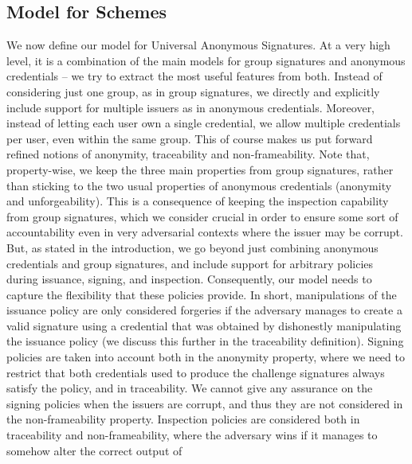 \subsection{Model for \UAS Schemes}
\label{ssec:model-uas}


We now define our model for Universal Anonymous Signatures. At a very high
level, it is a combination of the main models for group signatures and
anonymous credentials -- we try to extract the most useful features from both.
Instead of considering just one group, as in group signatures, we directly and
explicitly include support for multiple issuers as in anonymous credentials.
Moreover, instead of letting each user own a single credential, we allow
multiple credentials per user, even within the same group. This of course
makes us put forward refined notions of anonymity, traceability and
non-frameability. Note that, property-wise, we keep the three main properties
from group signatures, rather than sticking to the two usual properties of
anonymous credentials (anonymity and unforgeability). This is a consequence
of keeping the inspection capability from group signatures, which we consider
crucial in order to ensure some sort of accountability even in very adversarial
contexts where the issuer may be corrupt.
%
But, as stated in the introduction, we go beyond just combining anonymous
credentials and group signatures, and include support for arbitrary policies
during issuance, signing, and inspection. Consequently, our model needs to
capture the flexibility that these policies provide. In short, manipulations of
the issuance policy are only considered forgeries if the adversary manages to
create a valid signature using a credential that was obtained by dishonestly
manipulating the issuance policy (we discuss this further in the traceability
definition). Signing policies are taken into account both in the anonymity
property, where we need to restrict that both credentials used to produce the
challenge signatures always satisfy the policy, and in traceability.
We cannot give any assurance on the signing policies when the issuers are
corrupt, and thus they are not considered in the non-frameability property.
Inspection policies are considered both in traceability and non-frameability,
where the adversary wins if it manages to somehow alter the correct output of
